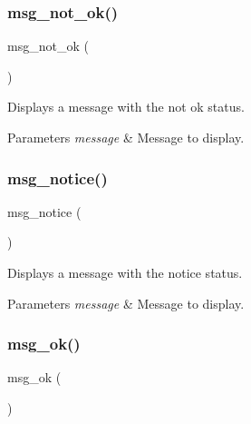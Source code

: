 \subsubsection{\texorpdfstring{msg\+\_\+not\+\_\+ok()}{msg\_not\_ok()}}
{\footnotesize\ttfamily msg\+\_\+not\+\_\+ok (\begin{DoxyParamCaption}\item[{message}]{ }\end{DoxyParamCaption})}



Displays a message with the \textquotesingle{}not ok\textquotesingle{} status. 


\begin{DoxyParams}{Parameters}
{\em message} & Message to display. \\
\hline
\end{DoxyParams}
\mbox{\label{group__message_ga61150f29d9ff1be264ec6d95a7b10161}} 
\subsubsection{\texorpdfstring{msg\+\_\+notice()}{msg\_notice()}}
{\footnotesize\ttfamily msg\+\_\+notice (\begin{DoxyParamCaption}\item[{message}]{ }\end{DoxyParamCaption})}



Displays a message with the \textquotesingle{}notice\textquotesingle{} status. 


\begin{DoxyParams}{Parameters}
{\em message} & Message to display. \\
\hline
\end{DoxyParams}
\mbox{\label{group__message_ga9f9b130e50d82e4ef3bf3554df755078}} 
\subsubsection{\texorpdfstring{msg\+\_\+ok()}{msg\_ok()}}
{\footnotesize\ttfamily msg\+\_\+ok (\begin{DoxyParamCaption}\item[{message}]{ }\end{DoxyParamCaption})}




